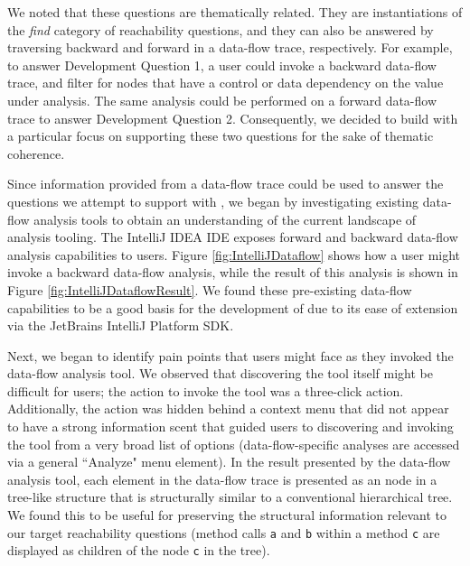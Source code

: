 \par We noted that these questions are thematically related. They are instantiations 
of the \textit{find} category of reachability questions, and they can also be
answered by traversing backward and forward in a data-flow trace, respectively.
For example, to answer Development Question 1, a user could invoke a backward
data-flow trace, and filter for nodes that have a control or data dependency
on the value under analysis.
The same analysis could be performed on a forward data-flow trace to answer
Development Question 2.
Consequently, we decided to build \toolname{} with a particular focus on
supporting these two questions for the sake of thematic coherence.

\par Since information provided from a data-flow trace could be used to answer
the questions we attempt to support with \toolname{}, we began by investigating 
existing data-flow analysis tools to obtain an understanding of the current 
landscape of analysis tooling.
The IntelliJ IDEA \ac{IDE} exposes forward and backward data-flow analysis
capabilities to users.
Figure \ref{fig:IntelliJDataflow} shows how a user might invoke a backward 
data-flow analysis, while the result of this analysis is shown in
Figure \ref{fig:IntelliJDataflowResult}.
We found these pre-existing data-flow capabilities to be a good basis for the 
development of \toolname{} due to its ease of extension via the JetBrains 
IntelliJ Platform \ac{SDK}.

\par Next, we began to identify pain points that users might face as they
invoked the data-flow analysis tool.
We observed that discovering the tool itself might be difficult for
users; the action to invoke the tool was a three-click action.
Additionally, the action was hidden behind a context menu that did not appear
to have a strong information scent that guided users to discovering and invoking
the tool from a very broad list of options (\ie data-flow-specific analyses
are accessed via a general ``Analyze" menu element).
In the result presented by the data-flow analysis tool, each element in the 
data-flow trace is presented as an node in a tree-like structure that is 
structurally similar to a conventional hierarchical tree.
We found this to be useful for preserving the structural information relevant
to our target reachability questions (\eg method calls \texttt{a} and \texttt{b}
within a method \texttt{c} are displayed as children of the node \texttt{c} in
the tree).

